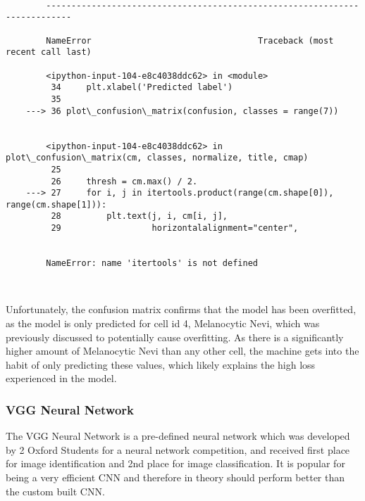 \documentclass[11pt]{article}
\begin{document}
    \begin{Verbatim}[commandchars=\\\{\}]

        ---------------------------------------------------------------------------

        NameError                                 Traceback (most recent call last)

        <ipython-input-104-e8c4038ddc62> in <module>
         34     plt.xlabel('Predicted label')
         35 
    ---> 36 plot\_confusion\_matrix(confusion, classes = range(7))
    

        <ipython-input-104-e8c4038ddc62> in plot\_confusion\_matrix(cm, classes, normalize, title, cmap)
         25 
         26     thresh = cm.max() / 2.
    ---> 27     for i, j in itertools.product(range(cm.shape[0]), range(cm.shape[1])):
         28         plt.text(j, i, cm[i, j],
         29                  horizontalalignment="center",
    

        NameError: name 'itertools' is not defined

    \end{Verbatim}

    \begin{center}
    \end{center}
    { \hspace*{\fill} \\}
    
    Unfortunately, the confusion matrix confirms that the model has been
overfitted, as the model is only predicted for cell id 4, Melanocytic
Nevi, which was previously discussed to potentially cause overfitting.
As there is a significantly higher amount of Melanocytic Nevi than any
other cell, the machine gets into the habit of only predicting these
values, which likely explains the high loss experienced in the model.

    \hypertarget{vgg-neural-network}{%
\subsubsection{VGG Neural Network}\label{vgg-neural-network}}

The VGG Neural Network is a pre-defined neural network which was
developed by 2 Oxford Students for a neural network competition, and
received first place for image identification and 2nd place for image
classification. It is popular for being a very efficient CNN and
therefore in theory should perform better than the custom built CNN.
\end{document}
